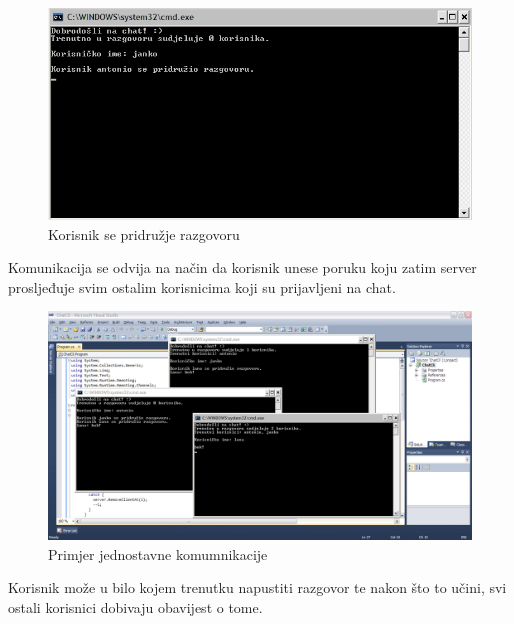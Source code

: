 \documentclass[10pt,a4paper,onecolumn,titlepage]{article}
\begin{document}
\begin{figure}[!ht]
\begin{minipage}{\textwidth}
\centering
\includegraphics[width=\textwidth]{images/joining_notification.jpg}
\caption{Korisnik se pridružje razgovoru}
\end{minipage}
\end{figure}

Komunikacija se odvija na način da korisnik unese poruku koju zatim server prosljeđuje svim ostalim korisnicima koji su prijavljeni na chat.

\newpage

\begin{figure}[!ht]
\begin{minipage}{\textwidth}
\centering
\includegraphics[width=\textwidth]{images/comunication.jpg}
\caption{Primjer jednostavne komumnikacije}
\end{minipage}
\end{figure}

Korisnik može u bilo kojem trenutku napustiti razgovor te nakon što to učini, svi ostali korisnici dobivaju obavijest o tome.
\end{document}
